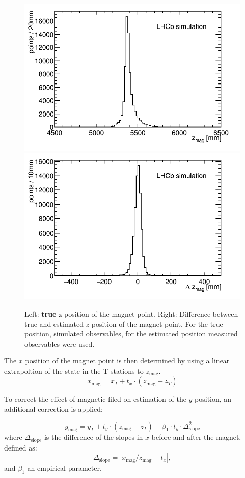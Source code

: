 \begin{figure}
 \begin{center}
   \includegraphics[width=0.49\linewidth]{figures/zMag.png}
    \includegraphics[width=0.49\linewidth]{figures/deltaZMag.png}
   \caption{Left: \textbf{true} z position of the magnet point. Right: Difference
   between true and estimated $z$ position of the magnet point. For the true position, simulated observables, for the estimated position measured observables were used.
     \label{fig:zMag}}
 \end{center}
\end{figure}

The $x$ position of the magnet point is then determined by using a linear extrapoltion of the
state in the T stations to $z_{\text{mag}}$.
\begin{equation}
x_{\text{mag}} = x_{T} + t_{x} \cdot (z_{\text{mag}} - z_{T})
\end{equation}

 
To correct the effect of magnetic filed on estimation of the $y$ position, an additional correction is applied:

\begin{equation}
\label{eq:ymag}
y_{\text{mag}} = y_{T} + t_{y} \cdot (z_{\text{mag}} - z_{T}) - \beta_{1} \cdot t_{y} \cdot \Delta_{\text{slope}}^{2}
\end{equation}
where $\Delta_{\text{slope}}$ is the difference of the slopes in $x$ before and after the magnet, defined as: 
\begin{equation}
\Delta_{\text{slope}} = \left| x_{\text{mag}}/z_{\text{mag}} - t_{x} \right|,
\end{equation}
and $\beta_{1}$ an empirical parameter.

